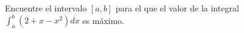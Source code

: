 \item Encuentre el intervalo $[a, b]$ para el que el valor de la integral $\int_a^b (2 + x - x^2) dx$ es máximo.
